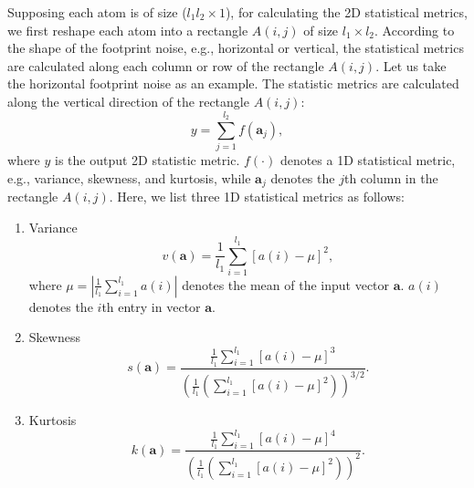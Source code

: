 Supposing each atom is of size ($l_1l_2\times 1$), for calculating the 2D statistical metrics, we first reshape each atom into a rectangle $A(i,j)$ of size $l_1\times l_2$. According to the shape of the footprint noise, e.g., horizontal or vertical, the statistical metrics are calculated along each column or row of the rectangle $A(i,j)$. Let us take the horizontal footprint noise as an example. The statistic metrics are calculated along the vertical direction of the rectangle $A(i,j)$:
\begin{equation}
\label{eq:me}
y=\sum_{j=1}^{l_2} f(\mathbf{a}_j),
\end{equation}
where $y$ is the output 2D statistic metric. $f(\cdot)$ denotes a 1D statistical metric, e.g., variance, skewness, and kurtosis, while $\mathbf{a}_j$ denotes the $j$th column in the rectangle $A(i,j)$. Here, we list three 1D statistical metrics as follows:
\begin{enumerate}
\item Variance
\begin{equation}
\label{eq:v}
v(\mathbf{a}) = \frac{1}{l_1} \sum_{i=1}^{l_1} [a(i) - \mu]^2,
\end{equation}
where $\mu= | \frac{1}{l_1} \sum_{i=1}^{l_1} a(i) |$ denotes the mean of the input vector $\mathbf{a}$. $a(i)$ denotes the $i$th entry in vector $\mathbf{a}$. 


\item Skewness
\begin{equation}
\label{eq:s}
s(\mathbf{a})= \frac{ \displaystyle \frac{1}{l_1} \sum_{i=1}^{l_1} [a(i)-\mu]^3}{\displaystyle \left(\frac{1}{l_1}\left(\sum_{i=1}^{l_1} [a(i)-\mu]^2\right)\right)^{3/2} }.
\end{equation}

\item Kurtosis
\begin{equation}
\label{eq:k}
k(\mathbf{a}) = \frac{ \displaystyle \frac{1}{l_1} \sum_{i=1}^{l_1} [a(i)-\mu]^4}{\displaystyle \left(\frac{1}{l_1}\left(\sum_{i=1}^{l_1} [a(i)-\mu]^2\right)\right)^2 }.
\end{equation}
\end{enumerate}




